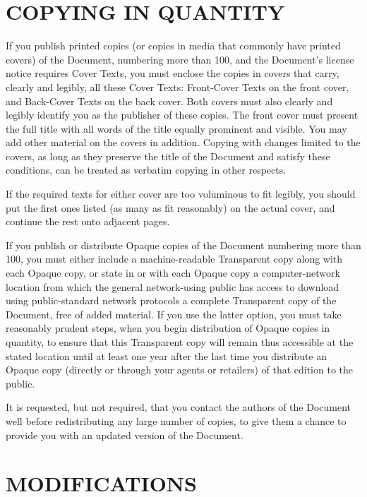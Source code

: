 \section{COPYING IN QUANTITY}

If you publish printed copies (or copies in media that commonly have
printed covers) of the Document, numbering more than 100, and the
Document's license notice requires Cover Texts, you must enclose the
copies in covers that carry, clearly and legibly, all these Cover
Texts: Front-Cover Texts on the front cover, and Back-Cover Texts on
the back cover.  Both covers must also clearly and legibly identify
you as the publisher of these copies.  The front cover must present
the full title with all words of the title equally prominent and
visible.  You may add other material on the covers in addition.
Copying with changes limited to the covers, as long as they preserve
the title of the Document and satisfy these conditions, can be treated
as verbatim copying in other respects.

If the required texts for either cover are too voluminous to fit
legibly, you should put the first ones listed (as many as fit
reasonably) on the actual cover, and continue the rest onto adjacent
pages.

If you publish or distribute Opaque copies of the Document numbering
more than 100, you must either include a machine-readable Transparent
copy along with each Opaque copy, or state in or with each Opaque copy
a computer-network location from which the general network-using
public has access to download using public-standard network protocols
a complete Transparent copy of the Document, free of added material.
If you use the latter option, you must take reasonably prudent steps,
when you begin distribution of Opaque copies in quantity, to ensure
that this Transparent copy will remain thus accessible at the stated
location until at least one year after the last time you distribute an
Opaque copy (directly or through your agents or retailers) of that
edition to the public.

It is requested, but not required, that you contact the authors of the
Document well before redistributing any large number of copies, to give
them a chance to provide you with an updated version of the Document.


\section{MODIFICATIONS}

